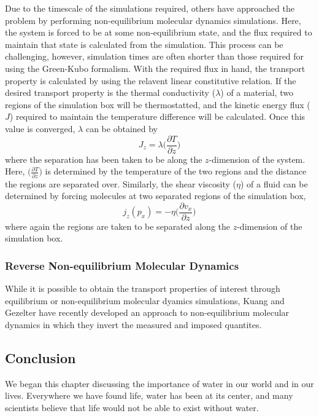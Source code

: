 Due to the timescale of the simulations required, others have
approached the problem by performing non-equilibrium molecular
dynamics simulations. Here, the system is forced to be at some
non-equilibrium state, and the flux required to maintain that state is
calculated from the simulation. This process can be challenging,
however, simulation times are often shorter than those required for
using the Green-Kubo formalism. With the required flux in hand, the
transport property is calculated by using the relavent linear
constitutive relation. If the desired transport property is the
thermal conductivity ($\lambda$) of a material, two regions of the simulation box
will be thermostatted, and the kinetic energy flux ($J$) required to
maintain the temperature difference will be calculated. Once this
value is converged, $\lambda$ can be obtained by 
\begin{equation}\label{thermalTransport}
J_{z} = \lambda \big(\frac{\partial T}{\partial z}\big)
\end{equation}
where the separation has been taken to be along the $z$-dimension of
the system.  Here, $\big(\frac{\partial T}{\partial z}\big) $ is
determined by the temperature of the two regions and the distance the
regions are separated over. Similarly, the shear viscosity
($\eta$) of a fluid can be determined by forcing molecules at two
separated regions of the simulation box,
\begin{equation}\label{momentumTransport}
  j_{z}(p_{x}) = -\eta \big(\frac{\partial v_{x}}{\partial z}\big)
\end{equation}
where again the regions are taken to be separated along the
$z$-dimension of the simulation box.

\subsubsection{Reverse Non-equilibrium Molecular Dynamics}
While it is possible to obtain the transport properties of interest
through equilibrium or non-equilibrium molecular dyamics simulations,
Kuang and Gezelter have recently developed an approach to
non-equilibrium molecular dynamics in which they invert the measured
and imposed quantites. 


\subsection{Conclusion}
We began this chapter discussing the importance of water in our world
and in our lives. Everywhere we have found life, water has been at its
center, and many scientists believe that life would not be able to
exist without water. 


